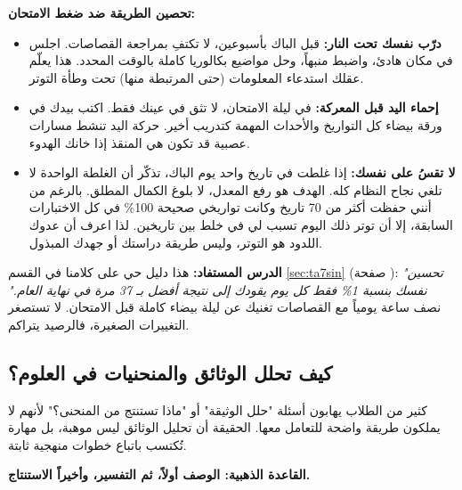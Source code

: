 \documentclass[12pt,a4paper]{book}
\newcommand{\importantAr}[1]{%
	\begin{important}
		\bfseries #1
	\end{important}
}
\begin{document}
	\vspace{1em}
	\textbf{تحصين الطريقة ضد ضغط الامتحان:}
	\begin{itemize}
		\item \textbf{درّب نفسك تحت النار:} قبل الباك بأسبوعين، لا تكتفِ بمراجعة القصاصات. اجلس في مكان هادئ، واضبط منبهاً، وحل مواضيع بكالوريا كاملة بالوقت المحدد. هذا يعلّم عقلك استدعاء المعلومات (حتى المرتبطة منها) تحت وطأة التوتر.
		\item \textbf{إحماء اليد قبل المعركة:} في ليلة الامتحان، لا تثق في عينك فقط. اكتب بيدك في ورقة بيضاء كل التواريخ والأحداث المهمة كتدريب أخير. حركة اليد تنشط مسارات عصبية قد تكون هي المنقذ إذا خانك الهدوء.
		\item \textbf{لا تقسُ على نفسك:} إذا غلطت في تاريخ واحد يوم الباك، تذكّر أن الغلطة الواحدة لا تلغي نجاح النظام كله. الهدف هو رفع المعدل، لا بلوغ الكمال المطلق. بالرغم من أنني حفظت أكثر من 70 تاريخ وكانت تواريخي صحيحة 100\% في كل الاختبارات السابقة، إلا أن توتر ذلك اليوم تسبب لي في خلط بين تاريخين. لذا اعرف أن عدوك اللدود هو التوتر، وليس طريقة دراستك أو جهدك المبذول.
	\end{itemize}
	
	\vspace{1em}
	\textbf{الدرس المستفاد:} هذا دليل حي على كلامنا في القسم \ref{sec:ta7sin} (صفحة \pageref{sec:ta7sin}): \textit{"تحسين نفسك بنسبة 1\% فقط كل يوم يقودك إلى نتيجة أفضل بـ 37 مرة في نهاية العام."} نصف ساعة يومياً مع القصاصات تغنيك عن ليلة بيضاء كاملة قبل الامتحان. لا تستصغر التغييرات الصغيرة، فالرصيد يتراكم.
	
	\subsection{كيف تحلل الوثائق والمنحنيات في العلوم؟}
	\label{sec:document-analysis}
	
	كثير من الطلاب يهابون أسئلة "حلل الوثيقة" أو "ماذا تستنتج من المنحنى؟" لأنهم لا يملكون طريقة واضحة للتعامل معها. الحقيقة أن تحليل الوثائق ليس موهبة، بل مهارة تُكتسب باتباع خطوات منهجية ثابتة.
	
	\importantAr{القاعدة الذهبية: الوصف أولاً، ثم التفسير، وأخيراً الاستنتاج.}
	
\end{document}
